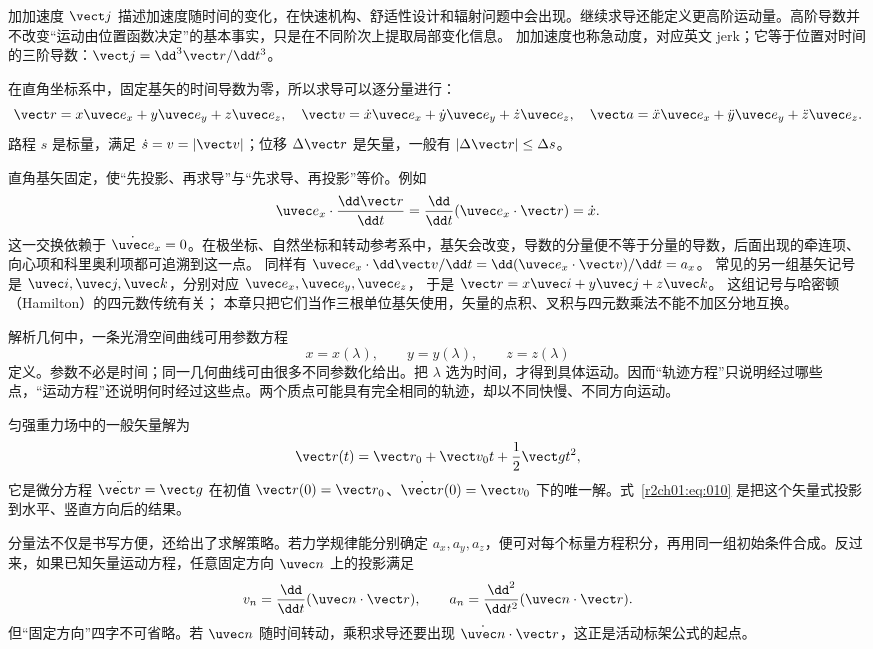 加加速度 $\vect j$ 描述加速度随时间的变化，在快速机构、舒适性设计和辐射问题中会出现。继续求导还能定义更高阶运动量。高阶导数并不改变“运动由位置函数决定”的基本事实，只是在不同阶次上提取局部变化信息。
加加速度也称急动度，对应英文 jerk；它等于位置对时间的三阶导数：$\vect j=\dd^3\vect r/\dd t^3$。

在直角坐标系中，固定基矢的时间导数为零，所以求导可以逐分量进行：
\begin{equation}
  \vect r=x\uvec e_x+y\uvec e_y+z\uvec e_z,\quad
  \vect v=\dot x\uvec e_x+\dot y\uvec e_y+\dot z\uvec e_z,\quad
  \vect a=\ddot x\uvec e_x+\ddot y\uvec e_y+\ddot z\uvec e_z.
  \label{r2ch01:eq:009}
\end{equation}
路程 $s$ 是标量，满足 $\dot s=v=\lvert\vect v\rvert$；位移 $\Delta\vect r$ 是矢量，一般有 $\lvert\Delta\vect r\rvert\leq \Delta s$。

直角基矢固定，使“先投影、再求导”与“先求导、再投影”等价。例如
\[
  \uvec e_x\cdot\frac{\dd\vect r}{\dd t}
  =\frac{\dd}{\dd t}(\uvec e_x\cdot\vect r)=\dot x.
\]
这一交换依赖于 $\dot{\uvec e}_x=0$。在极坐标、自然坐标和转动参考系中，基矢会改变，导数的分量便不等于分量的导数，后面出现的牵连项、向心项和科里奥利项都可追溯到这一点。
同样有 $\uvec e_x\cdot\dd\vect v/\dd t=\dd(\uvec e_x\cdot\vect v)/\dd t=a_x$。
常见的另一组基矢记号是 $\uvec i,\uvec j,\uvec k$，分别对应 $\uvec e_x,\uvec e_y,\uvec e_z$，
于是 $\vect r=x\uvec i+y\uvec j+z\uvec k$。
这组记号与哈密顿（Hamilton）的四元数传统有关；
本章只把它们当作三根单位基矢使用，矢量的点积、叉积与四元数乘法不能不加区分地互换。

解析几何中，一条光滑空间曲线可用参数方程
\[
  x=x(\lambda),\qquad y=y(\lambda),\qquad z=z(\lambda)
\]
定义。参数不必是时间；同一几何曲线可由很多不同参数化给出。把 $\lambda$ 选为时间，才得到具体运动。因而“轨迹方程”只说明经过哪些点，“运动方程”还说明何时经过这些点。两个质点可能具有完全相同的轨迹，却以不同快慢、不同方向运动。

匀强重力场中的一般矢量解为
\[
  \vect r(t)=\vect r_0+\vect v_0t+\frac12\vect g t^2,
\]
它是微分方程 $\ddot{\vect r}=\vect g$ 在初值 $\vect r(0)=\vect r_0$、$\dot{\vect r}(0)=\vect v_0$ 下的唯一解。式~\eqref{r2ch01:eq:010} 是把这个矢量式投影到水平、竖直方向后的结果。

分量法不仅是书写方便，还给出了求解策略。若力学规律能分别确定 $a_x,a_y,a_z$，便可对每个标量方程积分，再用同一组初始条件合成。反过来，如果已知矢量运动方程，任意固定方向 $\uvec n$ 上的投影满足
\[
  v_n=\frac{\dd}{\dd t}(\uvec n\cdot\vect r),\qquad
  a_n=\frac{\dd^2}{\dd t^2}(\uvec n\cdot\vect r).
\]
但“固定方向”四字不可省略。若 $\uvec n$ 随时间转动，乘积求导还要出现
$\dot{\uvec n}\cdot\vect r$，这正是活动标架公式的起点。

